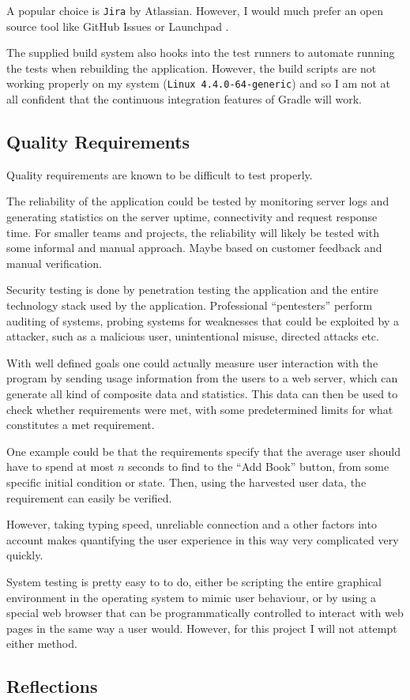 A popular choice is \texttt{Jira}\cite{tools:jira} by Atlassian.
However, I would much prefer an open source tool like GitHub
Issues\cite{tools:github-issues} or Launchpad \cite{tools:launchpad}.

The supplied build system also hooks into the test runners to automate running
the tests when rebuilding the application. However, the build scripts are not
working properly on my system (\texttt{Linux 4.4.0-64-generic}) and so I am not
at all confident that the continuous integration features of Gradle will work.


\subsection{Quality Requirements}
Quality requirements are known to be difficult to test properly.

The reliability of the application could be tested by monitoring server logs
and generating statistics on the server uptime, connectivity and request
response time. For smaller teams and projects, the reliability will likely
be tested with some informal and manual approach. Maybe based on customer
feedback and manual verification.

Security testing is done by penetration testing the application and the entire
technology stack used by the application.
Professional ``pentesters'' perform auditing of systems, probing systems for
weaknesses that could be exploited by a attacker, such as a malicious user,
unintentional misuse, directed attacks etc.

With well defined goals one could actually measure user interaction with the
program by sending usage information from the users to a web server, which can
generate all kind of composite data and statistics. This data can then be used
to check whether requirements were met, with some predetermined limits for what
constitutes a met requirement.

One example could be that the requirements specify that the average user should
have to spend at most $n$ seconds to find to the ``Add Book'' button, from some
specific initial condition or state.
Then, using the harvested user data, the requirement can easily be verified.

However, taking typing speed, unreliable connection and a other factors into
account makes quantifying the user experience in this way very complicated very
quickly.


System testing is pretty easy to to do, either be scripting the entire
graphical environment in the operating system to mimic user behaviour, or by
using a special web browser that can be programmatically controlled to interact
with web pages in the same way a user would.
However, for this project I will not attempt either method.


\subsection{Reflections}\label{task-1c-reflect}



